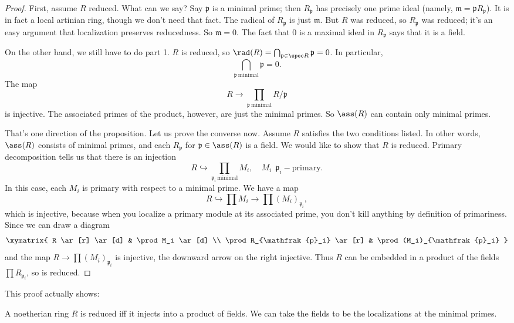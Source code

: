 \begin{proof} 
First, assume $R$ reduced. What can we say? Say $\mathfrak{p}$ is a minimal
prime; then $R_{\mathfrak{p}}$ has precisely one prime ideal (namely,
$\mathfrak{m}=\mathfrak{p}R_{\mathfrak{p}}$). It is in fact a local artinian ring, though we
don't need that fact. The radical of $R_{\mathfrak{p}}$ is just $\mathfrak{m}$.
But $R$ was reduced, so $R_{\mathfrak{p}}$ was reduced; it's an easy argument
that localization preserves reducedness. So $\mathfrak{m}=0$. The fact that 0
is a maximal ideal in $R_{\mathfrak{p}}$ says that it is a field.

On the other hand, we still have to do part 1. $R$ is reduced, so $\rad(R) =
\bigcap_{\mathfrak{p} \in \spec R} \mathfrak{p} = 0$. In particular, 
\[ \bigcap_{\mathfrak{p} \ \mathrm{minimal}}\mathfrak{p} = 0.  \]
The map
\[ R \to \prod_{\mathfrak{p} \ \mathrm{minimal}}R/\mathfrak{p}  \]
is injective. The associated primes of the product, however, are just the
minimal primes. So $\ass(R)$ can contain only minimal primes. 

That's one direction of the proposition. Let us prove the converse now. Assume
$R$ satisfies the two conditions listed. In other words, $\ass(R)$ consists of
minimal primes, and each $R_{\mathfrak{p}}$ for $\mathfrak{p} \in \ass(R)$ is a
field. We would like to show that $R$ is reduced. 
Primary decomposition tells us that there is an injection 
\[ R \hookrightarrow \prod_{\mathfrak{p}_i \ \mathrm{minimal}} M_i, \quad M_i
\ \  \mathfrak{p}_i-\mathrm{primary}. \]
In this case, each $M_i$ is primary with respect to a minimal prime. We have a
map
\[ R \hookrightarrow \prod M_i \to \prod (M_i)_{\mathfrak{p}_i},  \]
which is injective, because when you localize a primary module at its
associated prime, you don't kill anything by definition of primariness. Since
we can draw a diagram
\[ 
\xymatrix{
R \ar[r] \ar[d]  &  \prod M_i \ar[d]  \\
\prod R_{\mathfrak{p}_i} \ar[r] & \prod (M_i)_{\mathfrak{p}_i}
}
\]
and the map $R \to \prod (M_i)_{\mathfrak{p}_i}$ is injective, the downward
arrow on the right injective. Thus $R$ can be embedded in
a product of the fields $\prod R_{\mathfrak{p}_i}$, so is reduced.
\end{proof} 

This proof actually shows: 
\begin{proposition}[Scholism] A noetherian ring $R$ is reduced iff it injects
into a product of fields. We can take the fields to be the localizations at the
minimal primes. 
\end{proposition} 

